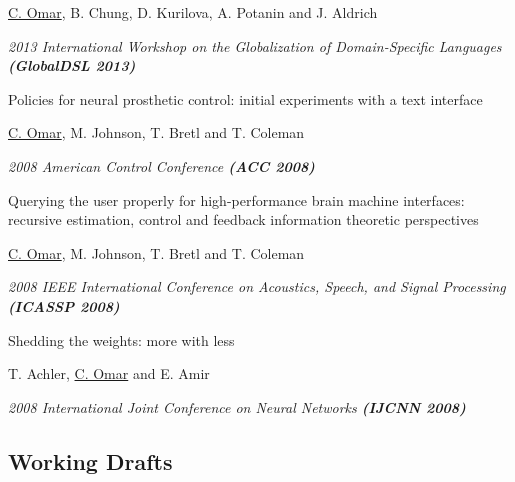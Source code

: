 \documentclass[10pt,letterpaper]{article}
\renewenvironment{itemize}{
  \begin{list}{}{
    \setlength{\leftmargin}{1.5em}
    \setlength{\itemsep}{0.25em}
    \setlength{\parskip}{0pt}
    \setlength{\parsep}{0.25em}
  }
}{
  \end{list}
}
\begin{document}
\begin{enumerate}[resume]
  \begin{itemize}
    \item \underline{C. Omar}, B. Chung, D. Kurilova, A. Potanin and J. Aldrich
    \item \textit{2013 International Workshop on the Globalization of Domain-Specific Languages \textbf{(GlobalDSL 2013)}}
  \end{itemize}
\item Policies for neural prosthetic control: initial experiments with a text interface
  \begin{itemize}
    \item \underline{C. Omar}, M. Johnson, T. Bretl and T. Coleman
    \item \textit{2008 American Control Conference \textbf{(ACC 2008)}}
  \end{itemize}
\item Querying the user properly for high-performance brain machine interfaces: recursive estimation, control and feedback information theoretic perspectives
  \begin{itemize}
    \item \underline{C. Omar}, M. Johnson, T. Bretl and T. Coleman
    \item \textit{2008 IEEE International Conference on Acoustics, Speech, and Signal Processing \textbf{(ICASSP 2008)}}
  \end{itemize}
\item Shedding the weights: more with less
  \begin{itemize}
    \item T. Achler, \underline{C. Omar} and E. Amir
    \item \textit{2008 International Joint Conference on Neural Networks \textbf{(IJCNN 2008)}}
  \end{itemize}
\end{enumerate}

\subsection*{Working Drafts}
\end{document}
